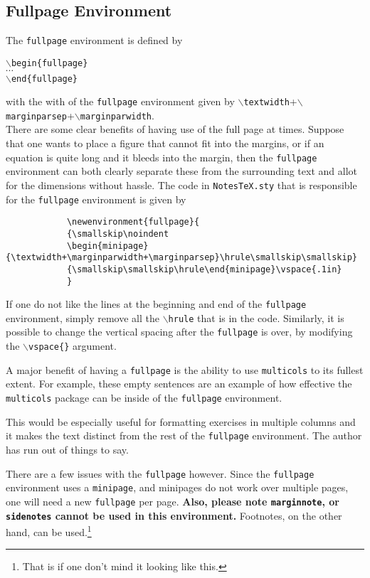 \documentclass[10pt]{article}
\begin{document}
	\subsection{Fullpage Environment}\label{Sub: Fullpage}
	\begin{fullpage}
		The \texttt{fullpage} environment is defined by
		\begin{center}
			\texttt{$\backslash$begin\{fullpage\}}\\
			$\cdots$\\
			\texttt{$\backslash$end\{fullpage\}}
		\end{center}
		with the with of the \texttt{fullpage} environment given by \texttt{$\backslash$textwidth}+\texttt{$\backslash$marginparsep}+\texttt{$\backslash$marginparwidth}.\\

		There are some clear benefits of having use of the full page at times. Suppose that one wants to place a figure that cannot fit into the margins, or if an equation is quite long and it bleeds into the margin, then the \texttt{fullpage} environment can both clearly separate these from the surrounding text and allot for the dimensions without hassle. The code in \texttt{NotesTeX.sty} that is responsible for the \texttt{fullpage} environment is given by
		\begin{verbatim}
			\newenvironment{fullpage}{
    		{\smallskip\noindent
    		\begin{minipage}{\textwidth+\marginparwidth+\marginparsep}\hrule\smallskip\smallskip}
    		{\smallskip\smallskip\hrule\end{minipage}\vspace{.1in}
    		}
		\end{verbatim}
		If one do not like the lines at the beginning and end of the \texttt{fullpage} environment, simply remove all the \texttt{$\backslash$hrule} that is in the code. Similarly, it is possible to change the vertical spacing after the \texttt{fullpage} is over, by modifying the \texttt{$\backslash$vspace\{\}} argument. 
		\begin{multicols}{2}
			A major benefit of having a \texttt{fullpage} is the ability to use \texttt{multicols} to its fullest extent. For example, these empty sentences are an example of how effective the \texttt{multicols} package can be inside of the \texttt{fullpage} environment. 

			This would be especially useful for formatting exercises in multiple columns and it makes the text distinct from the rest of the \texttt{fullpage} environment. The author has run out of things to say.
		\end{multicols}
		There are a few issues with the \texttt{fullpage} however. Since the \texttt{fullpage} environment uses a \texttt{minipage}, and minipages do not work over multiple pages, one will need a new \texttt{fullpage} per page. \textbf{Also, please note \texttt{marginnote}, or \texttt{sidenotes} cannot be used in this environment.} Footnotes, on the other hand, can be used.\footnote{That is if one don't mind it looking like this.}
	\end{fullpage}
\end{document}
